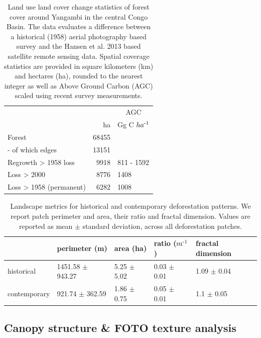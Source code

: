 \documentclass[remote sensing,article,submit,moreauthors,pdftex]{mdpi}
\begin{document}
\begin{table}[!h]

\caption{\label{tab:unnamed-chunk-10}Land use land cover change statistics of forest cover around Yangambi in the central Congo Basin. The data evaluates a difference between a historical (1958) aerial photography based survey and the Hansen et al. 2013 based satellite remote sensing data. Spatial coverage statistics are provided in square kilometers (km) and hectares (ha), rounded to the nearest integer as well as Above Ground Carbon (AGC) scaled using recent survey measurements.}
\centering
\begin{tabular}[t]{lrl}
\toprule
\multicolumn{2}{c}{ } & \multicolumn{1}{c}{AGC} \\
\cmidrule(l{3pt}r{3pt}){3-3}
  & ha & Gg C $ha\textsuperscript{-1}$\\
\midrule
Forest & 68455 & \\
-  of which edges & 13151 & \\
Regrowth > 1958 loss & 9918 & 811 - 1592\\
Loss > 2000 & 8776 & 1408\\
Loss > 1958 (permanent) & 6282 & 1008\\
\bottomrule
\end{tabular}
\end{table}

\begin{table}[!h]

\caption{\label{tab:unnamed-chunk-11}Landscape metrics for historical and contemporary deforestation patterns. We report patch perimeter and area, their ratio and fractal dimension. Values are reported as mean $\pm$ standard deviation, across all deforestation patches.}
\centering
\begin{tabular}[t]{lllll}
\toprule
  & perimeter (m) & area (ha) & ratio ($m\textsuperscript{-1}$) & fractal dimension\\
\midrule
historical & 1451.58 $\pm$ 943.27 & 5.25 $\pm$ 5.02 & 0.03 $\pm$ 0.01 & 1.09 $\pm$ 0.04\\
contemporary & 921.74 $\pm$ 362.59 & 1.86 $\pm$ 0.75 & 0.05 $\pm$ 0.01 & 1.1 $\pm$ 0.05\\
\bottomrule
\end{tabular}
\end{table}

\hypertarget{canopy-structure-foto-texture-analysis-1}{%
\subsection{Canopy structure \& FOTO texture
analysis}\label{canopy-structure-foto-texture-analysis-1}}
\end{document}
